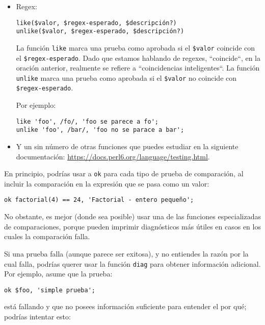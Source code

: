 \begin{itemize}
\item Regex:

\begin{verbatim}
like($valor, $regex-esperado, $descripción?)
unlike($valor, $regex-esperado, $descripción?)
\end{verbatim}

La función {\tt like} marca una prueba como aprobada si 
el \verb|$valor| coincide con el \verb|$regex-esperado|.
Dado que estamos hablando de regexes, ``coincide``, en la
oración anterior, realmente se refiere a ``coincidencias inteligentes``.
La función {\tt unlike} marca una prueba como aprobada si el
\verb|$valor| no coincide con \verb|$regex-esperado|.

Por ejemplo:
\begin{verbatim}
like 'foo', /fo/, 'foo se parece a fo';
unlike 'foo', /bar/, 'foo no se parace a bar';
\end{verbatim}

\item Y un sin número de otras funciones que puedes estudiar
en la siguiente documentación: \url{https://docs.perl6.org/language/testing.html}.

\end{itemize}

En principio, podrías usar a {\tt ok} para cada tipo de prueba
de comparación, al incluir la comparación en la expresión que se
pasa como un valor:

\begin{verbatim}
ok factorial(4) == 24, 'Factorial - entero pequeño';
\end{verbatim}

No obstante, es mejor (donde sea posible) usar una de las
funciones especializadas de comparaciones, porque pueden  
imprimir diagnósticos más útiles en casos en los cuales la
comparación falla.

Si una prueba falla (aunque parece ser exitosa), 
y no entiendes la razón por la cual falla,
podrías querer usar la función \verb|diag| para obtener información
adicional. Por ejemplo, asume que la prueba:


\begin{verbatim}
ok $foo, 'simple prueba';
\end{verbatim} 

está fallando y que no posees información suficiente para 
entender el por qué; podrías intentar esto:

